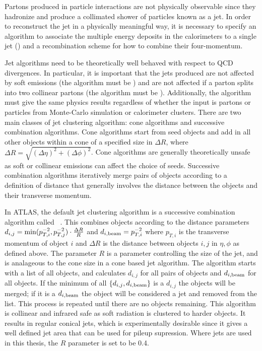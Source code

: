 Partons produced in particle interactions are not physically observable since
they hadronize and produce a collimated shower of particles known as a jet. In
order to reconstruct the jet in a physically meaningful way, it is necessary to
specify an algorithm to associate the multiple energy deposits in the calorimeters
to a single jet () and a recombination scheme for how to combine their
four-momentum. 

Jet algorithms need to be theoretically well behaved with respect to QCD
divergences. In particular, it is important that the jets produced are not
affected by soft emissions (the algorithm must be ) and
are not affected if a parton splits into two collinear partons (the algorithm
must be ). Additionally, the algorithm must give the same
physics results regardless of whether the input is partons or particles from
Monte-Carlo simulation or calorimeter clusters. There are two main classes of
jet clustering algorithm: cone algorithms and successive combination algorithms.
Cone algorithms start from seed objects and add in all other objects within a
cone of a specified size in $\Delta R$, where $\Delta R = \sqrt{(\Delta \eta)^{2} + (\Delta
\phi)^{2}} $. Cone algorithms are generally theoretically unsafe as soft or
collinear emissions can affect the choice of seeds. Successive combination
algorithms iteratively merge pairs of objects according to a definition of distance that
generally involves the distance between the objects and their transverse
momentum.

In ATLAS, the default jet clustering algorithm is a successive combination
algorithm called \antikt~\cite{1126-6708-2008-04-063}. This combines objects
according to the distance parameters $d_{i,j} =
{\rm min}(p_{T,i}^{-2},p_{T,j}^{-2}) \cdot \frac{ \Delta R }{R}$ and $d_{i,\rm{beam}} =
p_{T,i}^{-2}$ where $p_{T,i}$ is the transverse momentum of object $i$ and
$\Delta R$ is the distance between objects $i,j$ in $\eta, \phi$ as defined above.
The parameter $R$ is a parameter controlling the size of the jet, and is
analageous to the cone size in a cone based jet algorithm. The algorithm starts
with a list of all objects, and calculates $d_{i,j}$ for all pairs of objects and
$d_{i,{\rm beam}}$ for all objects. If the minimum of all $\{ d_{i,j}, d_{i,{\rm
beam}} \}$ is a  $d_{i,j}$ the objects will be merged; if it is a $ d_{i,{\rm
beam}}$ the object will be considered a jet and removed from the list. This
process is repeated until there are no objects remaining. This algorithm is
collinear and infrared safe as soft radiation is clustered to harder objects. 
It results in regular conical jets, which is experimentally desirable
since it gives a well defined jet area that can be used for pileup supression.
Where jets are used in this thesis, the $R$ parameter is set to be 0.4.

